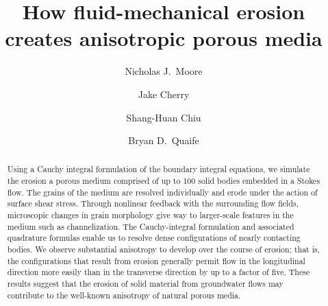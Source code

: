\documentclass[3p]{elsarticle}
\begin{document}
\title{How fluid-mechanical erosion creates anisotropic porous media}



\author[Colgate]{Nicholas J.~Moore}

\author[FSU]{Jake Cherry}

\author[NJIT]{Shang-Huan Chiu}

\author[FSU]{Bryan D.~Quaife}

\address[Colgate]{Colgate University}
\address[FSU]{Florida State University}
\address[NJIT]{New Jersey Institute of Technology}

\begin{abstract}
Using a Cauchy integral formulation of the boundary integral equations, we simulate the erosion a porous medium comprised of up to 100 solid bodies embedded in a Stokes flow. The grains of the medium are resolved individually and erode under the action of surface shear stress. Through nonlinear feedback with the surrounding flow fields, microscopic changes in grain morphology give way to larger-scale features in the medium such as channelization. The Cauchy-integral formulation and associated quadrature formulas enable us to resolve dense configurations of nearly contacting bodies.
We observe substantial anisotropy to develop over the course of erosion; that is, the configurations that result from erosion generally permit flow in the longitudinal direction more easily than in the transverse direction by up to a factor of five. These results suggest that the erosion of solid material from groundwater flows may contribute to the well-known anisotropy of natural porous media.
\end{abstract}
\maketitle

\end{document}
